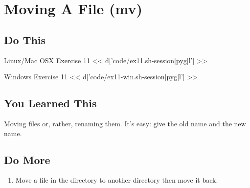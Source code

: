 \chapter{Moving A File (mv)}

\section{Do This}

\begin{code}{Linux/Mac OSX Exercise 11}
<< d['code/ex11.sh-session|pyg|l'] >>
\end{code}

\begin{code}{Windows Exercise 11}
<< d['code/ex11-win.sh-session|pyg|l'] >>
\end{code}

\section{You Learned This}

Moving files or, rather, renaming them.  It's easy: give the old name and
the new name.

\section{Do More}

\begin{enumerate}
\item Move a file in the  directory to another directory
    then move it back.
\end{enumerate}


